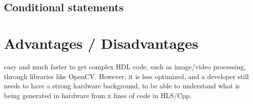   \subsection{Conditional statements}

\section{Advantages / Disadvantages}
    easy and much faster to get complex HDL code, such as image/video processing, through libraries like OpenCV. However, it is less optimized, and a developer still needs to have a strong hardware background, to be able to understand what is being generated in hardware from x lines of code in HLS/Cpp.
